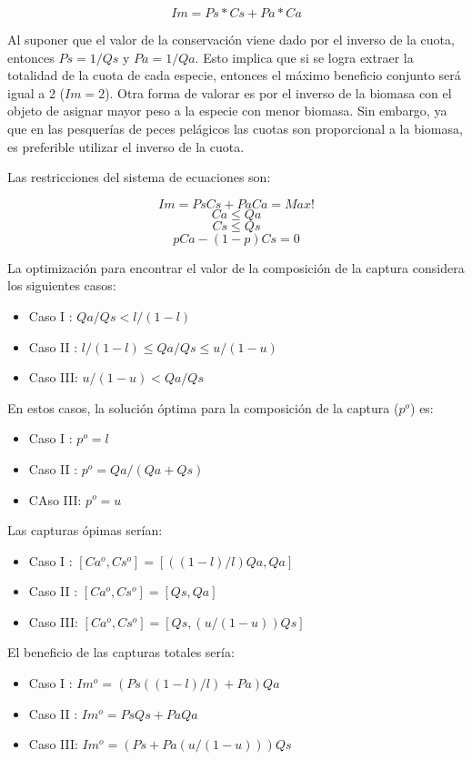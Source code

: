 \documentclass[]{article}
\begin{document}
\[Im=Ps*Cs+Pa*Ca\]

Al suponer que el valor de la conservación viene dado por el inverso de
la cuota, entonces $Ps=1/Qs$ y $Pa=1/Qa$. Esto implica que si se logra
extraer la totalidad de la cuota de cada especie, entonces el máximo
beneficio conjunto será igual a 2 ($Im=2$). Otra forma de valorar es por
el inverso de la biomasa con el objeto de asignar mayor peso a la
especie con menor biomasa. Sin embargo, ya que en las pesquerías de
peces pelágicos las cuotas son proporcional a la biomasa, es preferible
utilizar el inverso de la cuota.

Las restricciones del sistema de ecuaciones son:

\[Im=PsCs+PaCa=Max!\] \[Ca \leq Qa\] \[Cs \leq Qs\] \[pCa-(1-p)Cs=0\]

La optimización para encontrar el valor de la composición de la captura
considera los siguientes casos:

\begin{itemize}
\itemsep1pt\parskip0pt
\item
  Caso I : $Qa/Qs < l/(1-l)$
\item
  Caso II : $l/(1-l) \leq Qa/Qs \leq u/(1-u)$
\item
  Caso III: $u/(1-u) < Qa/Qs$
\end{itemize}

En estos casos, la solución óptima para la composición de la captura
($p^{o}$) es:

\begin{itemize}
\itemsep1pt\parskip0pt
\item
  Caso I : $p^{o}=l$
\item
  Caso II : $p^{o}=Qa/(Qa+Qs)$
\item
  CAso III: $p^{o}=u$
\end{itemize}

Las capturas ópimas serían:

\begin{itemize}
\itemsep1pt\parskip0pt
\item
  Caso I : $[Ca^{o},Cs^{o}]=[((1-l)/l)Qa,Qa]$
\item
  Caso II : $[Ca^{o},Cs^{o}]=[Qs,Qa]$
\item
  Caso III: $[Ca^{o},Cs^{o}]=[Qs,(u/(1-u))Qs]$
\end{itemize}

El beneficio de las capturas totales sería:

\begin{itemize}
\itemsep1pt\parskip0pt
\item
  Caso I : $Im^{o}=(Ps((1-l)/l)+Pa)Qa$
\item
  Caso II : $Im^{o}=PsQs+PaQa$
\item
  Caso III: $Im^{o}=(Ps+Pa(u/(1-u)))Qs$
\end{itemize}
\end{document}

